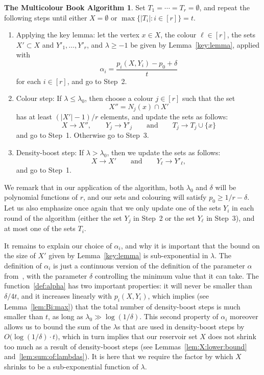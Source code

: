 \documentclass[12pt,reqno]{amsart}
\theoremstyle{definition}
\newtheorem*{RBalg}{The Multicolour Book Algorithm}
\theoremstyle{remark}
\renewcommand{\le}{\leqslant}
\renewcommand{\ge}{\geqslant}
\renewcommand{\to}{\rightarrow}
\begin{document}
\begin{RBalg}
Set $T_1 = \cdots = T_r = \emptyset$, and repeat the following steps until either $X = \emptyset$ or $\max\big\{ |T_i| : i \in [r] \big\} = t$. 
\begin{enumerate}[label=\arabic*., ref=\arabic*] 
\item\label{Alg:Step1} Applying the key lemma: let the vertex $x \in X$, the colour $\ell \in [r]$, the sets $X' \subset X$ and $Y'_1,\ldots,Y'_r$, and $\lambda \ge -1$ be given by Lemma~\ref{key:lemma}, applied with
\begin{equation}\label{def:alpha}
\alpha_i = \frac{p_i(X,Y_i) - p_0 + \delta}{t}
\end{equation}
for each $i \in [r]$, and go to Step~2.\smallskip
\item\label{Alg:Step2} Colour step: If $\lambda \le \lambda_0$, then choose a colour $j \in [r]$ such that the set
$$X'' = N_j(x) \cap X'$$ 
has at least $(|X'| - 1)/r$ elements, and update the sets as follows:
$$X \to X'', \qquad Y_j \to Y'_j \qquad \text{and} \qquad T_j \to T_j \cup \{x\}$$
and go to Step~1. Otherwise go to Step~3.\smallskip
\item\label{Alg:Step3} Density-boost step: If $\lambda > \lambda_0$, then we update the sets as follows:
$$X \to X' \qquad \text{and} \qquad Y_\ell \to Y'_\ell,$$
and go to Step~1.
\end{enumerate}  
\end{RBalg} 

We remark that in our application of the algorithm, both $\lambda_0$ and $\delta$ will be polynomial functions of $r$, and our sets and colouring will satisfy $p_0 \ge 1/r - \delta$. Let us also emphasize once again that we only update one of the sets $Y_i$ in each round of the algorithm (either the set $Y_j$ in Step~2 or the set $Y_\ell$ in Step~3), and at most one of the sets $T_i$. 

It remains to explain our choice of $\alpha_i$, and why it is important that the bound on the size of $X'$ given by Lemma~\ref{key:lemma} is sub-exponential in $\lambda$. The definition of $\alpha_i$ is just a continuous version of the definition of the parameter $\alpha$ from~\cite{CGMS}, with the parameter $\delta$ controlling the minimum value that it can take. The function~\eqref{def:alpha} has two important properties: it will never be smaller than $\delta / 4t$, and it increases linearly with $p_i(X,Y_i)$, which implies (see Lemma~\ref{lem:Bi:max}) that the total number of density-boost steps is much smaller than $t$, as long as $\lambda_0 \gg \log(1/\delta)$. This second property of $\alpha_i$ moreover allows us to bound the sum of the $\lambda$s that are used in density-boost steps by $O\big( \log(1/\delta) \cdot t \big)$, which in turn implies that our reservoir set $X$ does not shrink too much as a result of density-boost steps (see Lemmas~\ref{lem:X:lower:bound} and~\ref{lem:sum:of:lambdas}). It is here that we require the factor by which $X$ shrinks to be a sub-exponential function of $\lambda$. 
\end{document}
